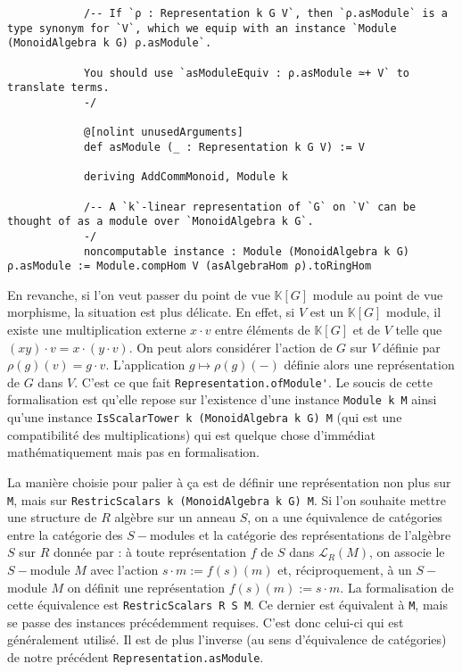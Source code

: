 \documentclass[10pt]{article}
\theoremstyle{definition}
\begin{document}
\begin{center}
	\begin{tcolorbox}[title = $L\exists\forall N$,width=13cm,text width=13cm,colback=lightgray!30,
		colframe=gray,sharp corners,
		rounded corners=uphill ]
		\begin{lstlisting}
			/-- If `ρ : Representation k G V`, then `ρ.asModule` is a type synonym for `V`, which we equip with an instance `Module (MonoidAlgebra k G) ρ.asModule`.
			
			You should use `asModuleEquiv : ρ.asModule ≃+ V` to translate terms.
			-/
			
			@[nolint unusedArguments]
			def asModule (_ : Representation k G V) := V
			
			deriving AddCommMonoid, Module k
			
			/-- A `k`-linear representation of `G` on `V` can be thought of as a module over `MonoidAlgebra k G`.
			-/
			noncomputable instance : Module (MonoidAlgebra k G) ρ.asModule := Module.compHom V (asAlgebraHom ρ).toRingHom
		\end{lstlisting}
	\end{tcolorbox}
\end{center}

En revanche, si l'on veut passer du point de vue $\mathbb{K}[G]$ module au point de vue  morphisme, la situation est plus délicate. En effet, si $V$ est un $\mathbb{K}[G]$ module, il existe une multiplication externe $x\cdot v$ entre éléments de $\mathbb{K}[G]$ et de $V$ telle que $(xy)\cdot v=x\cdot(y\cdot v)$. On peut alors considérer l'action de $G$ sur $V$ définie par $\rho(g)(v)=g\cdot v$. L'application $g\mapsto \rho(g)(-)$ définie alors une représentation de $G$ dans $V$. C'est ce que fait \lstinline|Representation.ofModule'|. Le soucis de cette formalisation est qu'elle repose sur l'existence d'une instance \lstinline|Module k M| ainsi qu'une instance \lstinline|IsScalarTower k (MonoidAlgebra k G) M| (qui est une compatibilité des multiplications) qui est quelque chose d'immédiat mathématiquement mais pas en formalisation.
\newline

La manière choisie pour palier à ça est de définir une représentation non plus sur \lstinline|M|, mais sur \lstinline|RestricScalars k (MonoidAlgebra k G) M|. Si l'on souhaite mettre une structure de $R$ algèbre sur un anneau $S$, on a une équivalence de catégories entre la catégorie des $S-$modules et la catégorie des représentations de l'algèbre $S$ sur $R$ donnée par : à toute représentation $f$ de $S$ dans $\mathcal{L}_R(M)$, on associe le $S-$module $M$ avec l'action $s\cdot m := f(s)(m)$ et, réciproquement, à un $S-$module $M$ on définit une représentation $f(s)(m):=s\cdot m$. La formalisation de cette équivalence est \lstinline|RestricScalars R S M|. Ce dernier est équivalent à \lstinline|M|, mais se passe des instances précédemment requises. C'est donc celui-ci qui est généralement utilisé. Il est de plus l'inverse (au sens d'équivalence de catégories) de notre précédent \lstinline|Representation.asModule|.
\end{document}
